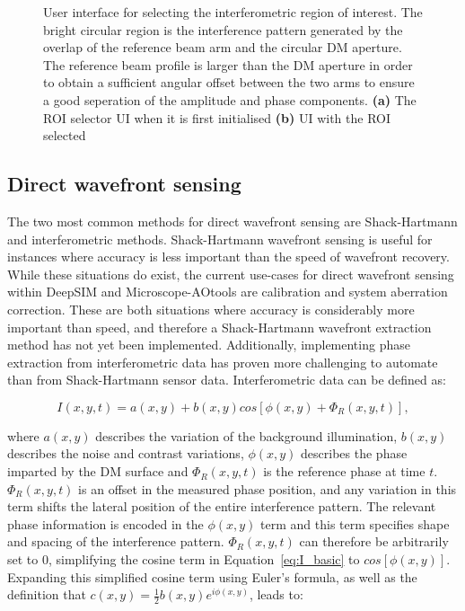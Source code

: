 \begin{figure}[h]
\begin{subfigure}{0.4\textwidth}
		\caption{}
		\label{fig:ROI_selector}
	\end{subfigure}
	\caption[User interface for selecting the interferometric region of interest]{User interface for selecting the interferometric region of interest. The bright circular region is the interference pattern generated by the overlap of the reference beam arm and the circular DM aperture. The reference beam profile is larger than the DM aperture in order to obtain a sufficient angular offset between the two arms to ensure a good seperation of the amplitude and phase components. \textbf{(a)} The ROI selector UI when it is first initialised \textbf{(b)} UI with the ROI selected}
	\label{fig:ROI_selectors}
\end{figure}

\subsection{Direct wavefront sensing}
\label{subsec:direct_wavefront_sensing}

The two most common methods for direct wavefront sensing are Shack-Hartmann and interferometric methods. Shack-Hartmann wavefront sensing is useful for instances where accuracy is less important than the speed of wavefront recovery. While these situations do exist, the current use-cases for direct wavefront sensing within DeepSIM and Microscope-AOtools are calibration and system aberration correction. These are both situations where accuracy is considerably more important than speed, and therefore a Shack-Hartmann wavefront extraction method has not yet been implemented. Additionally, implementing phase extraction from interferometric data has proven more challenging  to automate than from Shack-Hartmann sensor data. Interferometric data can be defined as:

\begin{equation}\label{eq:I_basic}
I(x,y,t) = a(x,y) + b(x,y)cos[\phi(x,y) + \Phi_{R}(x,y,t)],
\end{equation}

where $a(x,y)$ describes the variation of the background illumination, $b(x,y)$ describes the noise and contrast variations, $\phi(x,y)$ describes the phase imparted by the DM surface and $\Phi_{R}(x,y,t)$ is the reference phase at time $t$. $\Phi_{R}(x,y,t)$ is an offset in the measured phase position, and any variation in this term shifts the lateral position of the entire interference pattern. The relevant phase information is encoded in the $\phi(x,y)$ term and this term specifies shape and spacing of the interference pattern. $\Phi_{R}(x,y,t)$ can therefore be arbitrarily set to 0, simplifying the cosine term in Equation~\ref{eq:I_basic} to $cos[\phi(x,y)]$. Expanding this simplified cosine term using Euler's formula, as well as the definition that $c(x,y) = \frac{1}{2}b(x,y)e^{i\phi(x,y)}$, leads to:

